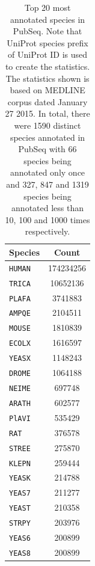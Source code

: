 \begin{table}[htbp]
\caption{Top 20 most annotated species in PubSeq. Note that UniProt species prefix of UniProt ID is used to create the statistics. The statistics shown is based on MEDLINE corpus dated January 27 2015. In total, there were 1590 distinct species annotated in PubSeq with 66 species being annotated only once and 327, 847 and 1319 species being annotated less than 10, 100 and 1000 times respectively.}
\centering
\begin{tabular}{ l c }
  \hline
  Species & Count \\
  \hline
  \hline
  \texttt{HUMAN} & 174234256 \\
  \hline
  \texttt{TRICA} & 10652136 \\
  \hline
  \texttt{PLAFA} & 3741883 \\
  \hline
  \texttt{AMPQE} & 2104511 \\
  \hline
  \texttt{MOUSE} & 1810839 \\
  \hline
  \texttt{ECOLX} & 1616597 \\
  \hline
  \texttt{YEASX} & 1148243 \\
  \hline
  \texttt{DROME} & 1064188 \\
  \hline
  \texttt{NEIME} & 697748 \\
  \hline
  \texttt{ARATH} & 602577 \\
  \hline
  \texttt{PlAVI} & 535429 \\
  \hline
  \texttt{RAT} & 376578 \\
  \hline
  \texttt{STREE} & 275870 \\
  \hline
  \texttt{KLEPN} & 259444 \\
  \hline
  \texttt{YEASK} & 214788 \\
  \hline
  \texttt{YEAS7} & 211277 \\
  \hline
  \texttt{YEAST} & 210358 \\
  \hline
  \texttt{STRPY} & 203976 \\
  \hline
  \texttt{YEAS6} & 200899 \\
  \hline
  \texttt{YEAS8} & 200899 \\
  \hline
\end{tabular}
  \label{tab:NERRanking}
\end{table}